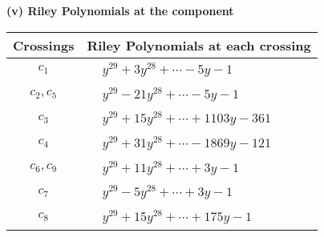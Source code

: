 \documentclass[1p]{elsarticle_modified}
\theoremstyle{definition}
\begin{document}
\newpage\renewcommand{\arraystretch}{1}
\flushleft \textbf{(v) Riley Polynomials at the component}\newline \\
\begin{tabular}{m{50pt}|m{274pt}}
Crossings & \hspace{64pt}Riley Polynomials at each crossing \\
\hline $$\begin{aligned}c_{1}\end{aligned}$$&$\begin{aligned}
&y^{29}+3 y^{28}+\cdots-5 y-1
\end{aligned}$\\
\hline $$\begin{aligned}c_{2},c_{5}\end{aligned}$$&$\begin{aligned}
&y^{29}-21 y^{28}+\cdots-5 y-1
\end{aligned}$\\
\hline $$\begin{aligned}c_{3}\end{aligned}$$&$\begin{aligned}
&y^{29}+15 y^{28}+\cdots+1103 y-361
\end{aligned}$\\
\hline $$\begin{aligned}c_{4}\end{aligned}$$&$\begin{aligned}
&y^{29}+31 y^{28}+\cdots-1869 y-121
\end{aligned}$\\
\hline $$\begin{aligned}c_{6},c_{9}\end{aligned}$$&$\begin{aligned}
&y^{29}+11 y^{28}+\cdots+3 y-1
\end{aligned}$\\
\hline $$\begin{aligned}c_{7}\end{aligned}$$&$\begin{aligned}
&y^{29}-5 y^{28}+\cdots+3 y-1
\end{aligned}$\\
\hline $$\begin{aligned}c_{8}\end{aligned}$$&$\begin{aligned}
&y^{29}+15 y^{28}+\cdots+175 y-1
\end{aligned}$\\
\hline
\end{tabular}\\~\\
\end{document}
